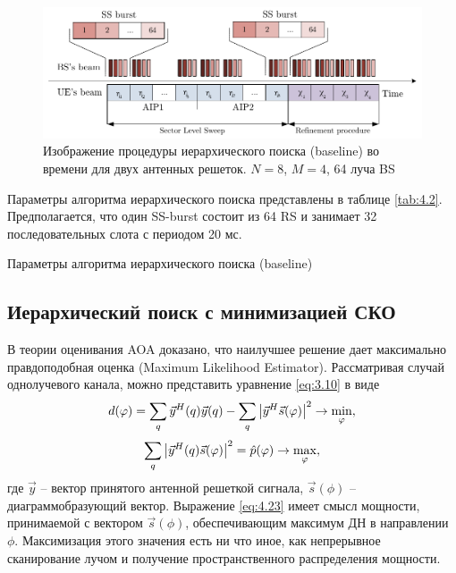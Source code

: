 \begin{figure}[ht]
    \centering
    \includegraphics[width=\linewidth]{figs/fig4.9}
    \caption{Изображение процедуры иерархического поиска (baseline) во времени для двух антенных решеток. $N=8$, $M=4$, 64 луча BS}
    \label{fig:4.9}
\end{figure}

Параметры алгоритма иерархического поиска представлены в таблице \ref{tab:4.2}.
Предполагается, что один SS-burst состоит из 64 RS и занимает 32 последовательных слота с периодом 20 мс.

\begin{table}
    \caption{Параметры алгоритма иерархического поиска (baseline)}
    \label{tab:4.2}
\end{table}


\subsection{Иерархический поиск с минимизацией СКО}
В теории оценивания AOA доказано, что наилучшее решение дает максимально правдоподобная оценка (Maximum Likelihood Estimator).
Рассматривая случай однолучевого канала, можно представить уравнение \eqref{eq:3.10} в виде
\begin{equation}
    d(\varphi) = \sum\limits_q \vec y^H(q) \vec y(q) - \sum\limits_q\abs{\vec y^H \vec s(\varphi)}^2 \to \min_\varphi,
\end{equation}
\begin{equation}
    \label{eq:4.23}
    \sum\limits_q \abs{\vec y^H(q) \vec s(\varphi)}^2 = \hat p(\varphi) \to \max_\varphi,
\end{equation}
где $\vec y$ -- вектор принятого антенной решеткой сигнала, $\vec s(\phi)$ --
диаграммобразующий вектор. Выражение \eqref{eq:4.23} имеет смысл мощности,
принимаемой с  вектором $\vec s(\phi)$, обеспечивающим максимум ДН в направлении
$\phi$. Максимизация этого значения есть ни что иное, как непрерывное
сканирование лучом и получение пространственного распределения мощности.

